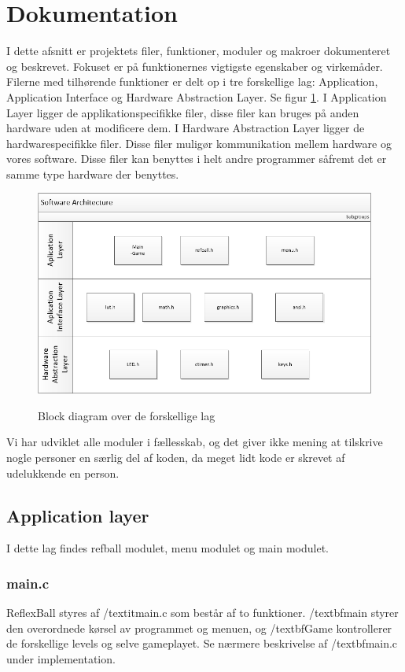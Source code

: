 \section{Dokumentation}

I dette afsnitt er projektets filer, funktioner, moduler og makroer dokumenteret og beskrevet. Fokuset er på funktionernes vigtigste egenskaber og virkemåder. Filerne med tilhørende funktioner er delt op i tre forskellige lag: Application, Application Interface og Hardware Abstraction Layer. Se figur \ref{block}.
 I Application Layer ligger de applikationspecifikke filer, disse filer kan bruges på anden hardware uden at modificere dem. I Hardware Abstraction Layer ligger de hardwarespecifikke filer. Disse filer muligør kommunikation mellem hardware og vores software. Disse filer kan benyttes i helt andre programmer såfremt det er samme type hardware der benyttes. 

\begin{figure}[h]
\begin{center}
\label{block}
\includegraphics[scale=0.6]{img/SoftwareArchitecture.png}
\caption{Block diagram over de forskellige lag}
\end{center}
\end{figure}
Vi har udviklet alle moduler i fællesskab, og det giver ikke mening at tilskrive nogle personer en særlig del af koden, da meget lidt kode er skrevet af udelukkende en person. 

\subsection{Application layer}
I dette lag findes refball modulet, menu modulet og main modulet.
\subsubsection{main.c}
ReflexBall styres af /textit{main.c} som består af to funktioner. /textbf{main} styrer den overordnede kørsel av programmet og menuen, og /textbf{Game} kontrollerer de forskellige levels og selve gameplayet. Se nærmere beskrivelse af /textbf{main.c} under implementation.

